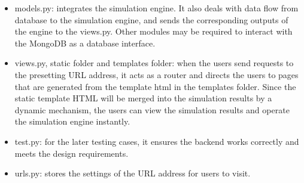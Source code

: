 \documentclass[12pt]{article}
\begin{document}
\begin{itemize}  
\item models.py: 
integrates the simulation engine. It also deals with data flow from database to the simulation engine, and sends the corresponding outputs of the engine to the views.py. Other modules may be required to interact with the MongoDB as a database interface.
\item views.py, static folder and templates folder: 
when the users send requests to the presetting URL address, it acts as a router and directs the users to pages that are generated from the template html in the templates folder. Since the static template HTML will be merged into the simulation results by a dynamic mechanism, the users can view the simulation results and operate the simulation engine instantly.
\item test.py: 
for the later testing cases, it ensures the backend works correctly and meets the design requirements.
\item  urls.py: 
stores the settings of the URL address for users to visit.
\end{itemize}
\end{document}
